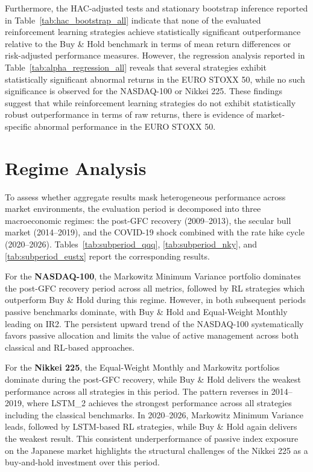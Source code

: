 \documentclass[]{elsarticle}
\begin{document}
Furthermore, the HAC-adjusted tests and stationary bootstrap inference reported in Table~\ref{tab:hac_bootstrap_all} indicate that none of the evaluated reinforcement learning strategies achieve statistically significant outperformance relative to the Buy \& Hold benchmark in terms of mean return differences or risk-adjusted performance measures. However, the regression analysis reported in Table~\ref{tab:alpha_regression_all} reveals that several strategies exhibit statistically significant abnormal returns in the EURO STOXX 50, while no such significance is observed for the NASDAQ-100 or Nikkei 225. These findings suggest that while reinforcement learning strategies do not exhibit statistically robust outperformance in terms of raw returns, there is evidence of market-specific abnormal performance in the EURO STOXX 50.

\hypertarget{regimeness}{%
\section{Regime Analysis}\label{regimeness}}

To assess whether aggregate results mask heterogeneous performance across market environments, the evaluation period is decomposed into three macroeconomic regimes: the post-GFC recovery (2009--2013), the secular bull market (2014--2019), and the COVID-19 shock combined with the rate hike cycle (2020--2026). Tables~\ref{tab:subperiod_qqq}, \ref{tab:subperiod_nky}, and \ref{tab:subperiod_eustx} report the corresponding results.

For the \textbf{NASDAQ-100}, the Markowitz Minimum Variance portfolio dominates the post-GFC recovery period across all metrics, followed by RL strategies which outperform Buy \& Hold during this regime. However, in both subsequent periods passive benchmarks dominate, with Buy \& Hold and Equal-Weight Monthly leading on IR2. The persistent upward trend of the NASDAQ-100 systematically favors passive allocation and limits the value of active management across both classical and RL-based approaches.

For the \textbf{Nikkei 225}, the Equal-Weight Monthly and Markowitz portfolios dominate during the post-GFC recovery, while Buy \& Hold delivers the weakest performance across all strategies in this period. The pattern reverses in 2014--2019, where LSTM\_2 achieves the strongest performance across all strategies including the classical benchmarks. In 2020--2026, Markowitz Minimum Variance leads, followed by LSTM-based RL strategies, while Buy \& Hold again delivers the weakest result. This consistent underperformance of passive index exposure on the Japanese market highlights the structural challenges of the Nikkei 225 as a buy-and-hold investment over this period.
\end{document}
